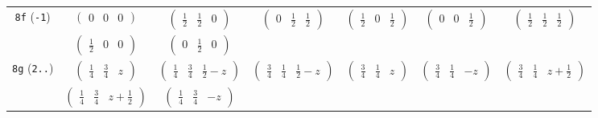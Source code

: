\documentclass[fleqn,9pt,landscape]{jsarticle}
\begin{document}
\begin{center}
\begin{longtable}{ccccccc}
{\tt 8f} ({\tt -1}) & $ \begin{pmatrix} 0 & 0 & 0 \end{pmatrix} $ & $ \begin{pmatrix} \frac{1}{2} & \frac{1}{2} & 0 \end{pmatrix} $ & $ \begin{pmatrix} 0 & \frac{1}{2} & \frac{1}{2} \end{pmatrix} $ & $ \begin{pmatrix} \frac{1}{2} & 0 & \frac{1}{2} \end{pmatrix} $ & $ \begin{pmatrix} 0 & 0 & \frac{1}{2} \end{pmatrix} $ & $ \begin{pmatrix} \frac{1}{2} & \frac{1}{2} & \frac{1}{2} \end{pmatrix} $ \\
& $ \begin{pmatrix} \frac{1}{2} & 0 & 0 \end{pmatrix} $ & $ \begin{pmatrix} 0 & \frac{1}{2} & 0 \end{pmatrix} $ & $  $ & $  $ & $  $ & $  $ \\ \hline
{\tt 8g} ({\tt 2..}) & $ \begin{pmatrix} \frac{1}{4} & \frac{3}{4} & z \end{pmatrix} $ & $ \begin{pmatrix} \frac{1}{4} & \frac{3}{4} & \frac{1}{2} - z \end{pmatrix} $ & $ \begin{pmatrix} \frac{3}{4} & \frac{1}{4} & \frac{1}{2} - z \end{pmatrix} $ & $ \begin{pmatrix} \frac{3}{4} & \frac{1}{4} & z \end{pmatrix} $ & $ \begin{pmatrix} \frac{3}{4} & \frac{1}{4} & - z \end{pmatrix} $ & $ \begin{pmatrix} \frac{3}{4} & \frac{1}{4} & z + \frac{1}{2} \end{pmatrix} $ \\
& $ \begin{pmatrix} \frac{1}{4} & \frac{3}{4} & z + \frac{1}{2} \end{pmatrix} $ & $ \begin{pmatrix} \frac{1}{4} & \frac{3}{4} & - z \end{pmatrix} $ & $  $ & $  $ & $  $ & $  $ \\ \hline

\end{longtable}
\end{center}
\end{document}
